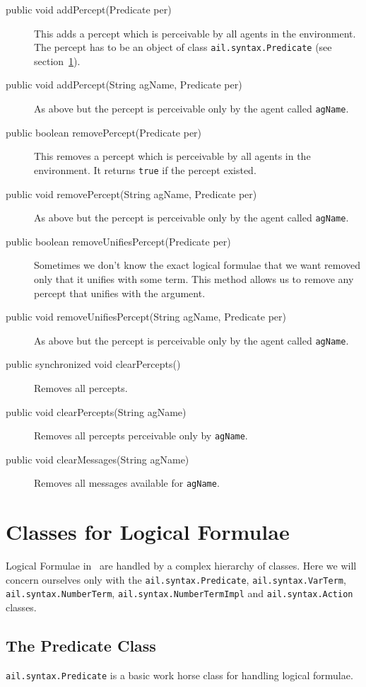 \documentclass[a4]{article}
\begin{document}
\begin{description}
\item[public void addPercept(Predicate per)] This adds a percept which is perceivable by all agents in the environment.  The percept has to be an object of class \texttt{ail.syntax.Predicate} (see section~\ref{s:formulas}).
\item[public void addPercept(String agName, Predicate per)] As above but the percept is perceivable only by the agent called \texttt{agName}.
\item[public boolean removePercept(Predicate per)] This removes a percept which is perceivable by all agents in the environment.  It returns \texttt{true} if the percept existed.
\item[public void removePercept(String agName, Predicate per)] As above but the percept is perceivable only by the agent called \texttt{agName}.
\item[public boolean removeUnifiesPercept(Predicate per)]  Sometimes we don't know the exact logical formulae that we want removed only that it unifies with some term.  This method allows us to remove any percept that unifies with the argument.
\item[public void removeUnifiesPercept(String agName, Predicate per)] As above but the percept is perceivable only by the agent called \texttt{agName}.
\item[public synchronized void clearPercepts()] Removes all percepts.
\item[public void clearPercepts(String agName)] Removes all percepts perceivable only by \texttt{agName}.
\item[public void clearMessages(String agName)] Removes all messages available for \texttt{agName}.
\end{description}

\section{Classes for Logical Formulae}
\label{s:formulas}

Logical Formulae in \ail\ are handled by a complex hierarchy of classes.  Here we will concern ourselves only with the \texttt{ail.syntax.Predicate}, \texttt{ail.syntax.VarTerm}, \texttt{ail.syntax.NumberTerm}, \texttt{ail.syntax.NumberTermImpl} and \texttt{ail.syntax.Action} classes.

\subsection{The Predicate Class}
\texttt{ail.syntax.Predicate} is a basic work horse class for handling logical formulae.
\end{document}
